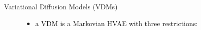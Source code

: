 \begin{frame}{Variational Diffusion Models (VDMs)}
    \begin{figure}
        \begin{itemize}
            \item a VDM is a Markovian HVAE with three restrictions:
                  \begin{itemize}
                      \setlength{\itemsep}{8pt}
                  \end{itemize}
        \end{itemize}
    \end{figure}
\end{frame}